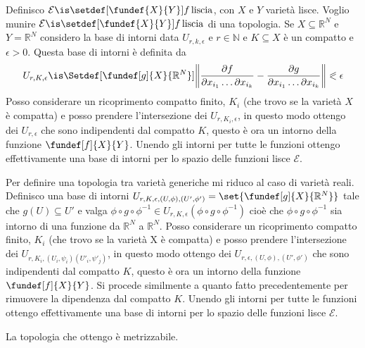 \begin{defn}
Definisco $\mathcal{E} \is \setdef[\fundef{X}{Y}]{f \, \text{liscia}}$, con $X$ e $Y$ varietà lisce. Voglio munire $\mathcal{E} \is \setdef[\fundef{X}{Y}]{f \, \text{liscia}}$ di una topologia. Se $X \subseteq \mathbb{R}^{N}$ e $Y = \mathbb{R}^{N}$ considero
la base di intorni data $U_{r, k, \epsilon}$ e $r \in \mathbb{N}$ e $K \subseteq X$  è un compatto e $\epsilon > 0$. Questa base di intorni è definita da 
\[U_{r, K, \epsilon} \is \Setdef[{\fundef[g]{X}{\mathbb{R}^{N}}}]{\left\|\frac{\partial f}{\partial x_{i_{1}} \dots \partial x_{i_{k}}} - \frac{\partial g}{\partial x_{i_{1}} \dots \partial x_{i_{k}}}\right\| \eqslantless \epsilon}\]
Posso considerare un ricoprimento compatto finito,  ${K_i}$ (che trovo se la varietà $X$ è compatta) e posso prendere l'intersezione dei $U_{r,K_i, \epsilon}$, in questo modo ottengo
dei $U_{r, \epsilon}$ che sono indipendenti dal compatto $K$, questo è ora un intorno della funzione $\fundef[f]{X}{Y}$. 
Unendo gli intorni per tutte le funzioni ottengo effettivamente una base di intorni per lo spazio delle funzioni lisce $\mathcal{E}$.
\end{defn}


\begin{defn}
Per definire una topologia tra varietà generiche mi riduco al caso di varietà reali.
Definisco una base di intorni $U_{r, K, \epsilon, (U, \phi), (U', \phi')} = \set{\fundef[g]{X}{\mathbb{R}^{N}}}$ tale che $g(U) \subseteq U'$ e valga 
$\phi \circ g \circ \phi^{-1} \in U_{r, K, \epsilon}(\phi \circ g \circ \phi^{-1})$ cioè che $\phi \circ g \circ \phi^{-1}$ sia intorno di una funzione da $\mathbb{R}^{N}$ a $\mathbb{R}^{N}$.
Posso considerare un ricoprimento compatto finito,  ${K_i}$ (che trovo se la varietà X è compatta) e posso prendere l'intersezione dei $U_{r,K_i, (U_i, \psi_i)(U'_i, \psi'_j)}$, in questo modo ottengo
dei $U_{r, \epsilon, (U, \phi), (U', \phi')}$ che sono indipendenti dal compatto $K$, questo è ora un intorno della funzione $\fundef[f]{X}{Y}$. Si procede similmente a quanto fatto precedentemente 
per rimuovere la dipendenza dal compatto $K$.
Unendo gli intorni per tutte le funzioni ottengo effettivamente una base di intorni per lo spazio delle funzioni lisce $\mathcal{E}$.

\end{defn}

\begin{oss}
 La topologia che ottengo è metrizzabile.
\end{oss}







